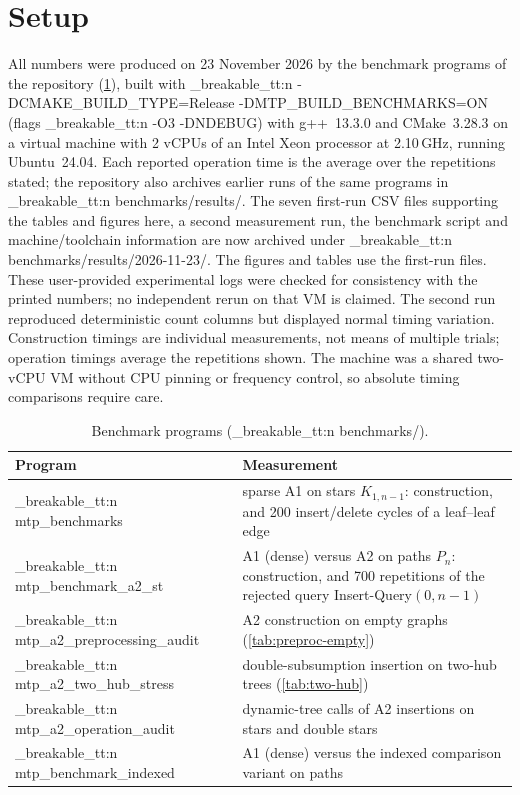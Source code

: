 \documentclass[11pt,a4paper,oneside]{report}
\theoremstyle{plain}
\theoremstyle{definition}
\theoremstyle{remark}
\newcommand{\op}[1]{\textsf{#1}}
\DeclareRobustCommand{\code}[1]{\mtp_breakable_tt:n {#1}}
\DeclareRobustCommand{\file}[1]{\mtp_breakable_tt:n {#1}}
\begin{document}
\section{Setup}\label{sec:exp-setup}
All numbers were produced on 23 November 2026 by the benchmark programs of the repository
(\cref{tab:benchmarks}), built with \code{-DCMAKE_BUILD_TYPE=Release
-DMTP_BUILD_BENCHMARKS=ON} (flags \code{-O3 -DNDEBUG}) with g++~13.3.0 and CMake~3.28.3 on a
virtual machine with 2 vCPUs of an Intel Xeon processor at 2.10\,GHz, running Ubuntu~24.04. Each
reported operation time is the average over the repetitions stated; the repository also
archives earlier runs of the same programs in \file{benchmarks/results/}.
The seven first-run CSV files supporting the tables and figures here, a second
measurement run, the benchmark script and machine/toolchain information are now
archived under \file{benchmarks/results/2026-11-23/}. The figures and tables
use the first-run files. These user-provided experimental logs were checked for
consistency with the printed numbers; no independent rerun on that VM is claimed.
The second run reproduced deterministic count columns but displayed normal
timing variation. Construction timings are individual measurements, not
means of multiple trials; operation timings average the repetitions shown.
The machine was a shared two-vCPU VM without CPU pinning or frequency control,
so absolute timing comparisons require care.

\begin{table}[ht]
\centering\small
\caption[Benchmark programs]{Benchmark programs (\file{benchmarks/}).}\label{tab:benchmarks}
\begin{tabularx}{\textwidth}{@{}lX@{}}
\toprule
\textbf{Program} & \textbf{Measurement}\\
\midrule
\code{mtp_benchmarks} & sparse A1 on stars \(K_{1,n-1}\): construction, and 200 insert/delete cycles of a leaf--leaf edge\\
\code{mtp_benchmark_a2_st} & A1 (dense) versus A2 on paths \(P_n\): construction, and 700 repetitions of the rejected query \op{Insert-Query}\((0,n-1)\)\\
\code{mtp_a2_preprocessing_audit} & A2 construction on empty graphs (\cref{tab:preproc-empty})\\
\code{mtp_a2_two_hub_stress} & double-subsumption insertion on two-hub trees (\cref{tab:two-hub})\\
\code{mtp_a2_operation_audit} & dynamic-tree calls of A2 insertions on stars and double stars\\
\code{mtp_benchmark_indexed} & A1 (dense) versus the indexed comparison variant on paths\\
\bottomrule
\end{tabularx}
\end{table}
\end{document}
